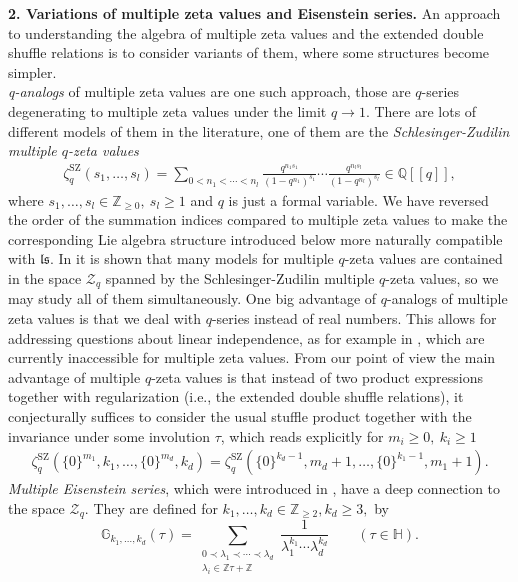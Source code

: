 \documentclass[12pt,reqno]{amsart}
\numberwithin{equation}{section}
\theoremstyle{definition}
\newcommand{\ZZ}{\mathbb{Z}}
\newcommand{\QQ}{\mathbb{Q}}
\newcommand{\Z}{\mathcal{Z}}
\newcommand{\ls}{\mathfrak{ls}}
\begin{document}
\vspace{0,3cm}
\textbf{2. Variations of multiple zeta values and Eisenstein series.} An approach to understanding the algebra of multiple zeta values and the extended double shuffle relations is to consider variants of them, where some structures become simpler. \\
\emph{q-analogs} of multiple zeta values are one such approach, those are $q$-series degenerating to multiple zeta values under the limit $q\to1$. There are lots of different models of them in the literature, one of them are the \emph{Schlesinger-Zudilin multiple $q$-zeta values}
\begin{align*}
\zeta_q^{\operatorname{SZ}}(s_1,\ldots,s_l)=\sum_{0<n_1<\cdots< n_l} \frac{q^{n_1s_1}}{(1-q^{n_1})^{s_1}}\cdots \frac{q^{n_ls_l}}{(1-q^{n_l})^{s_l}} \in \QQ[[q]],
\end{align*} 
where $s_1,\ldots,s_l\in \ZZ_{\geq0},\ s_l\geq1$ and $q$ is just a formal variable. We have reversed the order of the summation indices compared to multiple zeta values to make the corresponding Lie algebra structure introduced below more naturally compatible with $\ls$. In \cite{BK20} it is shown that many models for multiple $q$-zeta values are contained in the space $\Z_q$ spanned by the Schlesinger-Zudilin multiple $q$-zeta values, so we may study all of them simultaneously. One big advantage of $q$-analogs of multiple zeta values is that we deal with $q$-series instead of real numbers. This allows for addressing questions about linear independence, as for example in \cite{BK20}, which are currently inaccessible for multiple zeta values. From our point of view the main advantage of multiple $q$-zeta values is that instead of two product expressions together with regularization (i.e., the extended double shuffle relations), it conjecturally suffices to consider the usual stuffle product together with the invariance under some involution $\tau$, which reads explicitly for $m_i\geq0,\ k_i\geq1$
\begin{align*}
\zeta_q^{\operatorname{SZ}}(\{0\}^{m_1},k_1,\ldots,\{0\}^{m_d},k_d)=\zeta_q^{\operatorname{SZ}}(\{0\}^{k_d-1},m_d+1,\ldots,\{0\}^{k_1-1},m_1+1).
\end{align*}
\emph{Multiple Eisenstein series}, which were introduced in \cite{GKZ06}, have a deep connection to the space $\Z_q$. They are defined for $k_1,\ldots,k_d\in \ZZ_{\geq2}, k_d\geq 3,$ by 
\[\mathbb{G}_{k_1,\ldots,k_d}(\tau)=\sum_{\substack{0\prec \lambda_1\prec \cdots \prec \lambda_d \\ \lambda_i \in \ZZ\tau+\ZZ}} \frac{1}{\lambda_1^{k_1}\cdots \lambda_d^{k_d}} \qquad (\tau\in \mathbb{H}).\]
\end{document}
